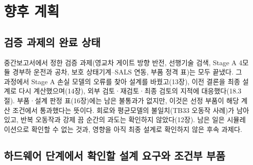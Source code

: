 \chapter{향후 계획}

\section{검증 과제의 완료 상태}

중간보고서에서 정한 검증 과제(영교차 게이트 방향 반전, 선행기술 검색, Stage A 4모듈 경부하 운전과 공차, 보호 상태기계–SALS 연동, 부품 정격 표)는 모두 끝냈다. 그 과정에서 Stage A 손실 모델의 오류를 찾아 설계를 바꿨고(13장), 이전 결론을 최종 설계로 다시 계산했으며(14장), 외부 검토·재검토·최종 검토의 지적에 대응했다(18.3절). 부품·설계 판정 표(16장)에는 남은 불통과가 없지만, 이것은 선정 부품이 해당 계산 조건에서 통과했다는 뜻이다. 회로와 평균모델의 불일치(TB33 오동작 사례)가 남아 있고, 반복 오동작과 강제 끔 순간의 과도는 확인하지 않았다(12장). 남은 일은 시뮬레이션으로 확인할 수 없는 것과, 영향을 아직 최종 설계로 확인하지 않은 후속 과제다.

\section{하드웨어 단계에서 확인할 설계 요구와 조건부 부품}

